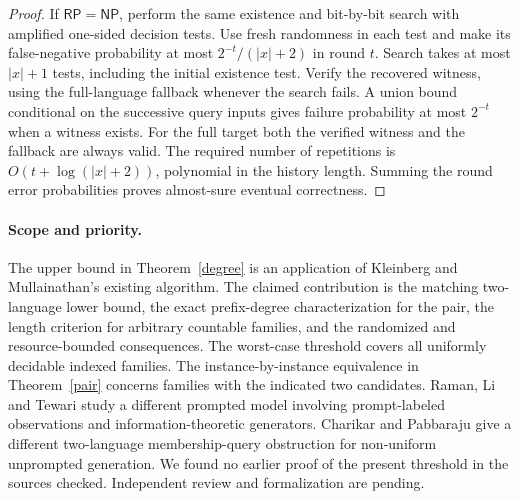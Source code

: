 \documentclass[11pt]{article}
\newcommand{\NP}{\mathsf{NP}}
\newcommand{\RP}{\mathsf{RP}}
\begin{document}
\begin{proof}
If $\RP=\NP$, perform the same existence and bit-by-bit search with amplified one-sided decision tests. Use fresh randomness in each test and make its false-negative probability at most $2^{-t}/(|x|+2)$ in round $t$. Search takes at most $|x|+1$ tests, including the initial existence test. Verify the recovered witness, using the full-language fallback whenever the search fails. A union bound conditional on the successive query inputs gives failure probability at most $2^{-t}$ when a witness exists. For the full target both the verified witness and the fallback are always valid. The required number of repetitions is $O(t+\log(|x|+2))$, polynomial in the history length. Summing the round error probabilities proves almost-sure eventual correctness.
\end{proof}

\paragraph{Scope and priority.}
The upper bound in Theorem~\ref{degree} is an application of Kleinberg and Mullainathan's existing algorithm. The claimed contribution is the matching two-language lower bound, the exact prefix-degree characterization for the pair, the length criterion for arbitrary countable families, and the randomized and resource-bounded consequences. The worst-case threshold covers all uniformly decidable indexed families. The instance-by-instance equivalence in Theorem~\ref{pair} concerns families with the indicated two candidates. Raman, Li and Tewari \cite[Section 4]{raman} study a different prompted model involving prompt-labeled observations and information-theoretic generators. Charikar and Pabbaraju \cite{charikar} give a different two-language membership-query obstruction for non-uniform unprompted generation. We found no earlier proof of the present threshold in the sources checked. Independent review and formalization are pending.
\end{document}
